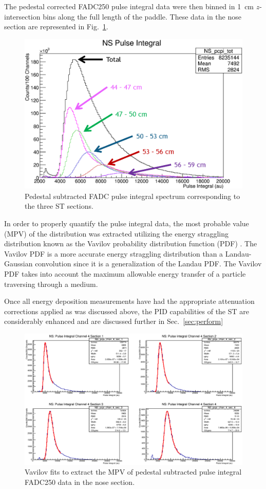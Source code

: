 The pedestal corrected FADC250 pulse integral data were then binned in 1~cm $z$-intersection bins along the full length of the paddle. These data in the nose section are represented in Fig.~\ref{fig:pisecnose}.
	\begin{figure}
		\centering
		\includegraphics[width=1.0\columnwidth]{calibration/figs/pi_sec_nose}
		\caption{Pedestal subtracted FADC pulse integral spectrum corresponding to the three ST sections.}
		\label{fig:pisecnose}
	\end{figure}
In order to properly quantify the pulse integral data, the most probable value (MPV) of the distribution was extracted utilizing the energy straggling distribution known as the Vavilov probability distribution function (PDF) \cite{vavilov_1957}.  The Vavilov PDF is a more accurate energy straggling distribution than a Landau-Gaussian convolution since it is a generalization of the Landau PDF.  The Vavilov PDF takes into account the maximum allowable energy transfer of a particle traversing through a medium.

Once all energy deposition measurements have had the appropriate attenuation corrections applied as was discussed above, the PID capabilities of the ST are considerably enhanced and are discussed further in Sec.~\ref{sec:perform}


\begin{figure}
	\centering
	\includegraphics[width=1.0\columnwidth]{calibration/figs/pi_sec_nose_fits}
	\caption{Vavilov fits to extract the MPV of pedestal subtracted pulse integral FADC250 data in the nose section.}
	\label{fig:pisecnosefits}
\end{figure}

